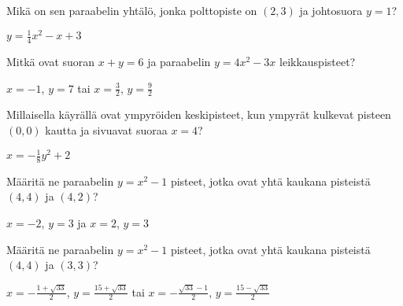 \begin{tehtavasivu}
\begin{tehtava}
Mikä on sen paraabelin yhtälö, jonka polttopiste on $(2, 3)$ ja johtosuora $y=1$?
\begin{vastaus}
$y = \frac{1}{4}x^2-x+3$
\end{vastaus}
\end{tehtava}

\begin{tehtava}
Mitkä ovat suoran $x+y=6$ ja paraabelin $y=4x^2-3x$ leikkauspisteet?
\begin{vastaus}
$x = -1$, $ y = 7$ tai $x = \frac{3}{2}$, $y = \frac{9}{2}$
\end{vastaus}
\end{tehtava}

\begin{tehtava}
Millaisella käyrällä ovat ympyröiden keskipisteet, kun ympyrät kulkevat pisteen $(0, 0)$ kautta ja sivuavat suoraa $x=4$?
\begin{vastaus}
$x=-\frac{1}{8}y^2+2$
\end{vastaus}
\end{tehtava}



\begin{tehtava}
Määritä ne paraabelin $y=x^2-1$ pisteet, jotka ovat yhtä kaukana pisteistä $(4, 4)$ ja $(4, 2)$?
\begin{vastaus}
$x=-2$, $y=3$ ja $x=2$, $y=3$
\end{vastaus}
\end{tehtava}

\begin{tehtava}
Määritä ne paraabelin $y=x^2-1$ pisteet, jotka ovat yhtä kaukana pisteistä $(4, 4)$ ja $(3, 3)$?
\begin{vastaus}
$x = -\frac{1+\sqrt{33}}{2}$,   $y = \frac{15+\sqrt{33}}{2}$ tai $x = -\frac{\sqrt{33}-1}{2}$,   $y = \frac{15-\sqrt{33}}{2}$
\end{vastaus}
\end{tehtava}




\end{tehtavasivu}
